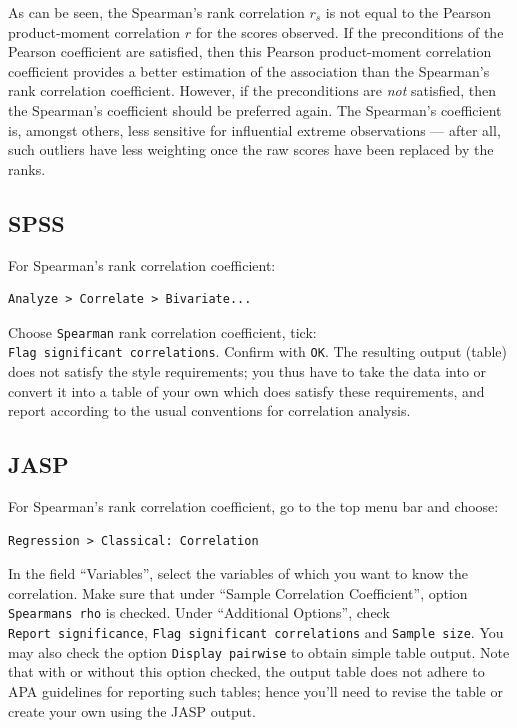 \documentclass[
]{book}
\begin{document}
As can be seen, the Spearman's rank correlation \(r_s\) is not equal to the
Pearson product-moment correlation \(r\) for the scores observed.
If the preconditions of the Pearson coefficient are satisfied, then this
Pearson product-moment correlation coefficient provides a better estimation of the
association than the Spearman's rank correlation coefficient. However, if the preconditions
are \emph{not} satisfied, then the Spearman's coefficient should be preferred again. The
Spearman's coefficient is, amongst others, less sensitive for influential extreme
observations --- after all, such outliers have less weighting once the
raw scores have been replaced by the ranks.

\hypertarget{spss-7}{%
\subsection{SPSS}\label{spss-7}}

For Spearman's rank correlation coefficient:

\begin{verbatim}
Analyze > Correlate > Bivariate...
\end{verbatim}

Choose \texttt{Spearman} rank correlation coefficient, tick:
\texttt{Flag\ significant\ correlations}. Confirm with \texttt{OK}. The resulting
output (table) does not satisfy the style requirements; you thus have to take
the data into or convert it into a table of your own which does satisfy these requirements,
and report according to the usual conventions for correlation analysis.

\hypertarget{jasp-8}{%
\subsection{JASP}\label{jasp-8}}

For Spearman's rank correlation coefficient, go to the top menu bar and choose:

\begin{verbatim}
Regression > Classical: Correlation
\end{verbatim}

In the field ``Variables'', select the variables of which you want to know the correlation.
Make sure that under ``Sample Correlation Coefficient'', option \texttt{Spearman\textquotesingle{}s\ rho} is checked.
Under ``Additional Options'', check \texttt{Report\ significance}, \texttt{Flag\ significant\ correlations} and \texttt{Sample\ size}. You may also check the option \texttt{Display\ pairwise} to obtain simple table output.
Note that with or without this option checked, the output table does not adhere to APA guidelines for reporting such tables; hence you'll need to revise the table or create your own using the JASP output.
\end{document}
